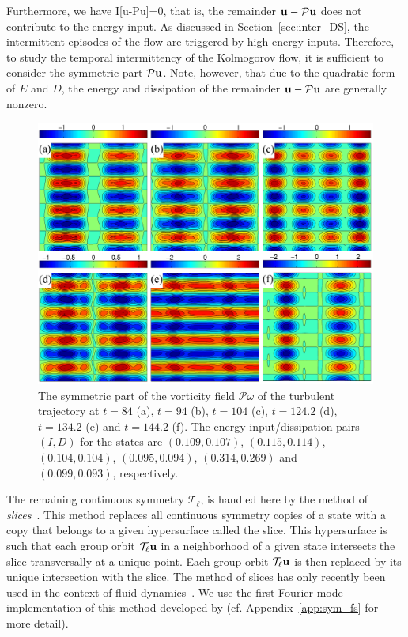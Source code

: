 \documentclass{jfm}
\begin{document}
Furthermore, we have
\beq
I[\vc u-\mathcal P\vc u]=0,
\label{eq:I_lin}
\eeq
that is, the remainder $\mathbf u-\mathcal P\mathbf u$ does not contribute to the energy input.
As discussed in Section~\ref{sec:inter_DS}, the intermittent episodes of the flow are triggered
by high energy inputs. Therefore, to study the temporal intermittency of the Kolmogorov flow, it is
sufficient to consider the symmetric part $\mathcal P\mathbf u$.
Note, however, that due to the quadratic form of $E$ and $D$,
the energy and dissipation of the remainder $\mathbf u-\mathcal P\mathbf u$
are generally nonzero.
%
\begin{figure}
\centering
\includegraphics[width=\textwidth]{Pw_erg}
\caption{The symmetric part of the vorticity field $\mathcal P\omega$
of the turbulent trajectory at
$t=84$ (a),
$t=94$ (b),
$t=104$ (c),
$t=124.2$ (d),
$t=134.2$ (e) and
$t=144.2$ (f).
The energy input/dissipation pairs $(I,D)$ for the states are
$(0.109,0.107)$,
$(0.115,0.114)$,
$(0.104,0.104)$,
$(0.095,0.094)$,
$(0.314,0.269)$ and
$(0.099,0.093)$, respectively.}
\label{fig:Pw_erg}
\end{figure}

The remaining continuous symmetry $\mathcal T_\ell$, is handled here by the method of
\emph{slices}~\citep{cartan35,field80,rowley03}.
This method replaces all continuous symmetry copies of a
state with a
copy that belongs to a given hypersurface called the slice. This hypersurface is such that each
group orbit $\mathcal T_\ell\mathbf u$
in a neighborhood of a given state
intersects the slice transversally at a unique point.
Each group orbit $\mathcal T_\ell\mathbf u$ is then replaced by its unique intersection with the slice.
The method of slices has only recently been used in the context of fluid
dynamics~\citep{ACHKW11,WSC15}.
We use the first-Fourier-mode implementation of this
method developed by (cf. Appendix~\ref{app:sym_fs} for more detail).
\end{document}
